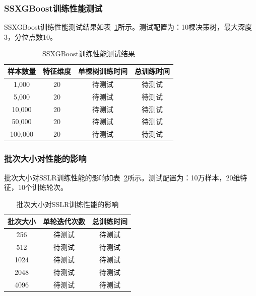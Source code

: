 \subsubsection{SSXGBoost训练性能测试}

SSXGBoost训练性能测试结果如表~\ref{tab:ssxgboost-perf}所示。测试配置为：10棵决策树，最大深度3，分位点数10。

\begin{table}[htbp]
    \centering
    \caption{SSXGBoost训练性能测试结果}
    \label{tab:ssxgboost-perf}
    \begin{tabular}{cccc}
        \toprule
        \textbf{样本数量} & \textbf{特征维度} & \textbf{单棵树训练时间} & \textbf{总训练时间} \\
        \midrule
        1,000 & 20 & 待测试 & 待测试 \\
        5,000 & 20 & 待测试 & 待测试 \\
        10,000 & 20 & 待测试 & 待测试 \\
        50,000 & 20 & 待测试 & 待测试 \\
        100,000 & 20 & 待测试 & 待测试 \\
        \bottomrule
    \end{tabular}
\end{table}

\subsubsection{批次大小对性能的影响}

批次大小对SSLR训练性能的影响如表~\ref{tab:batch-size-perf}所示。测试配置为：10万样本，20维特征，10个训练轮次。

\begin{table}[htbp]
    \centering
    \caption{批次大小对SSLR训练性能的影响}
    \label{tab:batch-size-perf}
    \begin{tabular}{ccc}
        \toprule
        \textbf{批次大小} & \textbf{单轮迭代次数} & \textbf{总训练时间} \\
        \midrule
        256 & 待测试 & 待测试 \\
        512 & 待测试 & 待测试 \\
        1024 & 待测试 & 待测试 \\
        2048 & 待测试 & 待测试 \\
        4096 & 待测试 & 待测试 \\
        \bottomrule
    \end{tabular}
\end{table}

